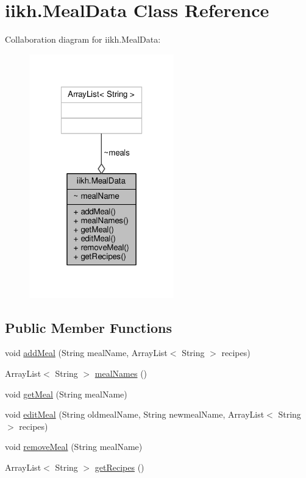 \hypertarget{classiikh_1_1MealData}{\section{iikh.\-Meal\-Data Class Reference}
\label{classiikh_1_1MealData}
}


Collaboration diagram for iikh.\-Meal\-Data\-:
\nopagebreak
\begin{figure}[H]
\begin{center}
\leavevmode
\includegraphics[width=178pt]{classiikh_1_1MealData__coll__graph}
\end{center}
\end{figure}
\subsection*{Public Member Functions}
\begin{DoxyCompactItemize}
\item 
void \hyperlink{classiikh_1_1MealData_a5e0c768c8948199c94fcd73b7b23b1ab}{add\-Meal} (String meal\-Name, Array\-List$<$ String $>$ recipes)
\item 
Array\-List$<$ String $>$ \hyperlink{classiikh_1_1MealData_a52bb34ef7c9131647e13cb540201b991}{meal\-Names} ()
\item 
void \hyperlink{classiikh_1_1MealData_a9cd185cb7c3d4e2bc42f4fdef2d5eab0}{get\-Meal} (String meal\-Name)
\item 
void \hyperlink{classiikh_1_1MealData_a7b7dd623490e5468cde17108ca4ef249}{edit\-Meal} (String oldmeal\-Name, String newmeal\-Name, Array\-List$<$ String $>$ recipes)
\item 
void \hyperlink{classiikh_1_1MealData_a4f8082d1c78009c2ac358d1a1e304f5b}{remove\-Meal} (String meal\-Name)
\item 
Array\-List$<$ String $>$ \hyperlink{classiikh_1_1MealData_a57e6f2b3be7ea592beac256bc92f89f2}{get\-Recipes} ()
\end{DoxyCompactItemize}


